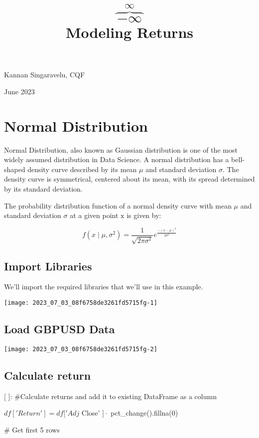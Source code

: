 \documentclass[10pt]{article}
\title{$\overbrace{-\infty}^{\infty}$ \\ Modeling Returns }
\author{}
\date{}
\begin{document}
\maketitle
Kannan Singaravelu, CQF

June 2023

\section*{Normal Distribution}
Normal Distribution, also known as Gaussian distribution is one of the most widely assumed distribution in Data Science. A normal distribution has a bell-shaped density curve described by its mean $\mu$ and standard deviation $\sigma$. The density curve is symmetrical, centered about its mean, with its spread determined by its standard deviation.

The probability distribution function of a normal density curve with mean $\mu$ and standard deviation $\sigma$ at a given point $\mathrm{x}$ is given by:

$$
f\left(x \mid \mu, \sigma^{2}\right)=\frac{1}{\sqrt{2 \pi \sigma^{2}}} e^{\frac{-(x-\mu)^{2}}{2 \sigma^{2}}}
$$

\subsection*{Import Libraries}
We'll import the required libraries that we'll use in this example.

\begin{center}
\texttt{[image: 2023\_07\_03\_08f6758de3261fd5715fg-1]}
\end{center}

\subsection*{Load GBPUSD Data}
\begin{center}
\texttt{[image: 2023\_07\_03\_08f6758de3261fd5715fg-2]}
\end{center}

\subsection*{Calculate return}
[ ]: \#Calculate returns and add it to existing DataFrame as a column

$d f[' R e t u r n ']=d f[' A d j$ Close' $] \cdot$ pct\_change().fillna(0)

\# Get first 5 rows
\end{document}
